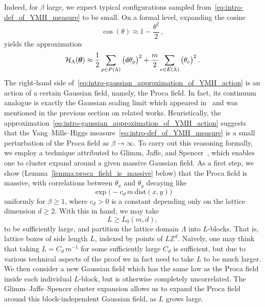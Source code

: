 \documentclass[11pt]{article}
\theoremstyle{definition}
\theoremstyle{remark}
\numberwithin{theorem}{section}
\newcommand{\bZ}{\mathbb Z}
\begin{document}
    Indeed, for $\beta$ large, we expect typical configurations sampled from~\eqref{eq:intro-def_of_YMH_measure} to be small. On a formal level, expanding the cosine 
    \[
    \cos(\theta) \approx 1- \frac{\theta^2}{2} \, ,
    \]
    yields the approximation   
    \begin{equation}
        \label{eq:intro-gaussian_approximation_of_YMH_action}
        \mathcal{H}_{\Lambda}(\boldsymbol{\theta}) \approx \frac{1}{2} \sum_{p\in P(\Lambda)} \big({\sf d} \theta_p\big)^2 + \frac{m}{2} \sum_{e\in E(\Lambda)} \big(\theta_e\big)^2 \, . 
    \end{equation}
    The right-hand side of~\eqref{eq:intro-gaussian_approximation_of_YMH_action} is an action of a certain Gaussian field, namely, the Proca field.
    In fact, its continuum analogue is exactly the Gaussian scaling limit which appeared in~\cite{Chatterjee-HiggsMechanism} and was mentioned in the previous section on related works. 
    Heuristically, the approximation~\eqref{eq:intro-gaussian_approximation_of_YMH_action} suggests that the Yang--Mills--Higgs measure~\eqref{eq:intro-def_of_YMH_measure} is a small perturbation of the Proca field as $\beta \to \infty$. To carry out this reasoning formally, we employ a technique attributed to Glimm, Jaffe, and Spencer~\cite{Glimm-Jaffe-book, Glimm-Jaffe-Spencer}, which enables one to cluster expand around a given massive Gaussian field. As a first step, we show (Lemma~\ref{lemma:proca_field_is_massive} below) that the Proca field is massive, with correlations between $\theta_x$ and $\theta_y$ decaying like
    \[
    \exp\big( - c_d \, m \, \text{dist}(x,y)\big)
    \]
    uniformly for $\beta \ge 1$, where $c_d > 0$ is a constant depending only on the lattice dimension $d \ge 2$. With this in hand, we may take    
    \begin{equation}
    L \ge L_0(m,d),
    \end{equation}
    to be sufficiently large, and partition the lattice domain $\Lambda$ into $L$-blocks. That is, lattice boxes of side length $L$, indexed by points of $L \bZ^d$. Naively, one may think that taking $L= C_d \, m^{-1}$ for some sufficiently large $C_d$ is sufficient, but due to various technical aspects of the proof we in fact need to take $L$ to be much larger. We then consider a new Gaussian field which has the same law as the Proca field inside each individual $L$-block, but is otherwise completely uncorrelated. The Glimm--Jaffe--Spencer cluster expansion allows us to expand the Proca field around this block-independent Gaussian field, as $L$ grows large.
\end{document}
